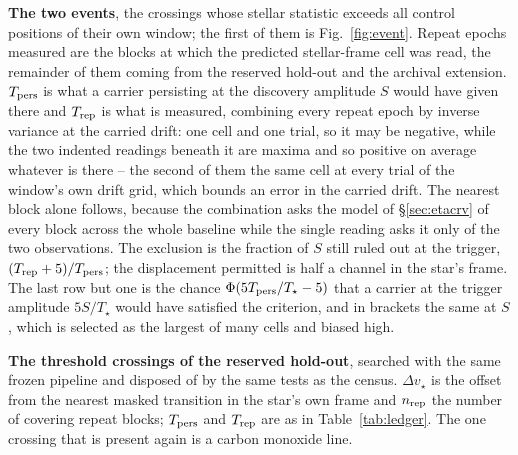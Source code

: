 \begin{table}
\centering
\caption{\textbf{The two events}, the crossings whose
stellar statistic exceeds all \NCtrl{} control positions of their own window;
the first of them is Fig.~\ref{fig:event}.
Repeat epochs measured are the blocks at which the predicted stellar-frame
cell was read, the remainder of them coming from the reserved hold-out and the
archival extension.
$T_{\rm pers}$ is what a carrier persisting at the discovery amplitude $S$
would have given there and $T_{\rm rep}$ is what is measured, combining every
repeat epoch by inverse variance at the carried drift: one cell and one
trial, so it may be negative, while the two indented readings beneath it are
maxima and so positive on average whatever is there -- the second of them
the same cell at every trial of the window's own drift grid, which bounds an
error in the carried drift. The nearest block alone
follows, because the combination asks the model of \S\ref{sec:etacrv} of
every block across the whole baseline while the single reading asks it only
of the two observations. The exclusion is the fraction of $S$ still
ruled out at the trigger, $(T_{\rm rep}+5)/T_{\rm pers}$; the displacement
permitted is half a channel in the star's frame. The last row but one is the
chance $\Phi(5T_{\rm pers}/T_\star-5)$ that a carrier at the trigger
amplitude $5S/T_\star$ would have satisfied the criterion, and in brackets the
same at $S$, which is selected as the largest of many cells and biased high.}
\label{tab:cand}
\footnotesize

\end{table}

\begin{table}
\centering
\caption{\textbf{The threshold crossings of the reserved hold-out}, searched
with the same frozen pipeline and disposed of by the same tests as the
census. $\Delta v_\star$ is the offset from the nearest masked transition in
the star's own frame and $n_{\rm rep}$ the number of covering repeat blocks;
$T_{\rm pers}$ and $T_{\rm rep}$ are as in Table~\ref{tab:ledger}. The one
crossing that is present again is a carbon monoxide line.}
\label{tab:holdout}
\scriptsize

\end{table}




